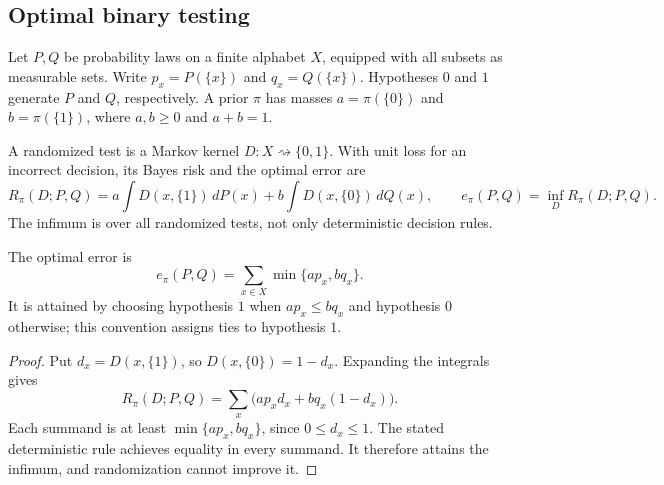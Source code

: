 \subsection{Optimal binary testing}
\label{sec:binary-testing}

Let $P,Q$ be probability laws on a finite alphabet $X$, equipped with
all subsets as measurable sets. Write $p_x=P(\{x\})$ and
$q_x=Q(\{x\})$. Hypotheses $0$ and $1$ generate $P$ and $Q$,
respectively. A prior $\pi$ has masses $a=\pi(\{0\})$ and
$b=\pi(\{1\})$, where $a,b\ge0$ and $a+b=1$.

A randomized test is a Markov kernel $D:X\rightsquigarrow\{0,1\}$.
With unit loss for an incorrect decision, its Bayes risk and the
optimal error are
\[
 R_\pi(D;P,Q)
 =a\int D(x,\{1\})\,dP(x)+b\int D(x,\{0\})\,dQ(x),
 \qquad
 e_\pi(P,Q)=\inf_D R_\pi(D;P,Q).
\]
The infimum is over all randomized tests, not only deterministic
decision rules.

\begin{theorem}
\label{thm:binary-bayes-error}
The optimal error is
\[
 e_\pi(P,Q)=\sum_{x\in X}\min\{ap_x,bq_x\}.
\]
It is attained by choosing hypothesis $1$ when $ap_x\le bq_x$ and
hypothesis $0$ otherwise; this convention assigns ties to hypothesis $1$.
\end{theorem}
\begin{proof}
Put $d_x=D(x,\{1\})$, so $D(x,\{0\})=1-d_x$. Expanding the
integrals gives
\[
 R_\pi(D;P,Q)=\sum_x\bigl(ap_xd_x+bq_x(1-d_x)\bigr).
\]
Each summand is at least $\min\{ap_x,bq_x\}$, since $0\le d_x\le1$.
The stated deterministic rule achieves equality in every summand.
It therefore attains the infimum, and randomization cannot improve it.
\end{proof}
